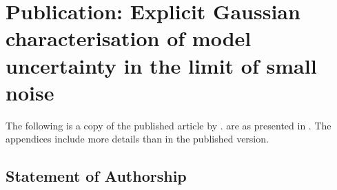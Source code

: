 
\chapter{Publication: Explicit Gaussian characterisation of model uncertainty in the limit of small noise}\label{ch:limit_paper}
The following is a copy of the published article by \citet{BlakeEtAl_2023_ExplicitGaussianCharacterisation}.
 are as presented in \cite{BlakeEtAl_2023_ExplicitGaussianCharacterisation}.
The appendices include more details than in the published version.

\section{Statement of Authorship}



